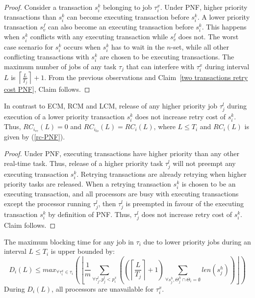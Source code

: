 %
\begin{proof}\normalfont
%
Consider a transaction $s_{i}^{k}$ belonging to job $\tau_{i}^{x}$. Under PNF, higher priority transactions than $s_i^k$ can become executing transaction before $s_i^k$. A lower priority transaction $s_v^f$ can also become an executing transaction before $s_i^k$. This happens when $s_i^k$ conflicts with any executing transaction while $s_v^f$ does not. The worst case scenario for $s_{i}^{k}$ occurs when $s_i^k$ has to wait in the $n$-set, while all other conflicting transactions with $s_i^k$ are chosen to be executing transactions. The maximum number of jobs of any task $\tau_{j}$ that can interfere with $\tau_{i}^{x}$ during interval $L$ is $\left\lceil \frac{L}{T_{j}}\right\rceil +1$. From  the previous observations and Claim~\ref{two transactions retry cost PNF}, Claim follows.
\end{proof}
%
\begin{clm}\label{clm:no_release_rc_under_pnf}
%
In contrast to ECM, RCM and LCM, release of any higher priority job $\tau_j^l$ during execution of a lower priority transaction $s_i^k$ does not increase retry cost of $s_i^k$. Thus, $RC_{i_{re}}(L)=0$ and $RC_{i_{to}}(L)=RC_i(L)$, where $L \le T_i$ and $RC_i(L)$ is given by (\ref{rc-PNF}).
%
\end{clm}
%
\begin{proof}
%
Under PNF, executing transactions have higher priority than any other real-time task. Thus, release of a higher priority task $\tau_j^l$ will not preempt any executing transaction $s_i^k$. Retrying transactions are already retrying when higher priority tasks are released. When a retrying transaction $s_i^k$ is chosen to be an executing transaction, and all processors are busy with executing transactions except the processor running $\tau_j^l$, then $\tau_j^l$ is preempted in favour of the executing transaction $s_i^k$ by definition of PNF. Thus, $\tau_j^l$ does not increase retry cost of $s_i^k$. Claim follows.
%
\end{proof}
%
\begin{clm}\label{delay}
The maximum blocking time for any job in $\tau_{i}$ due to lower priority jobs 
during an interval $L\le T_{i}$ is upper bounded by:
%
\begin{equation}
D_i(L)\le max_{\forall \tau_i^x \in \tau_i}\left(\left\lfloor \frac{1}{m}\sum_{\forall\tau_{j}^{l},p_j^l<p_i^x}\left(\left(\left\lceil \frac{L}{T_{j}}\right\rceil +1\right)\sum_{\forall s_{j}^{h}, \Theta_j^h \cap \Theta_i = \emptyset }len\left(s_{j}^{h}\right)\right)\right\rfloor\right)
\label{PNF-delay}
\end{equation}
%
During $D_i(L)$, all processors are unavailable for $\tau_{i}^{x}$.
%
\end{clm}
